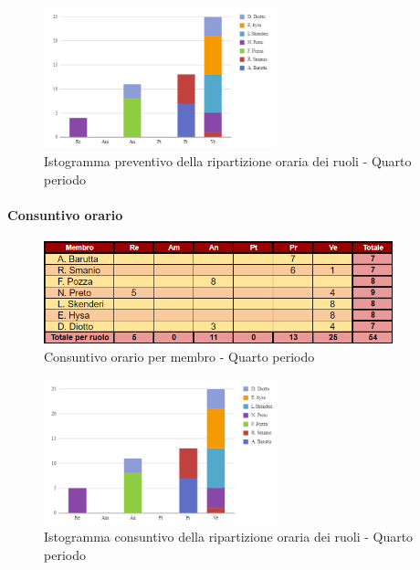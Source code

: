 \vspace{0.6cm}

\begin{figure}[H]
    \centering
    \includegraphics[width=0.6\textwidth]{../Images/preventivoDivisioneRuoli4Periodo.png}
    \caption{Istogramma preventivo della ripartizione oraria dei ruoli - Quarto periodo}
    \label{fig:Preventivo_ripartizione_oraria_4}
\end{figure}

\paragraph{Consuntivo orario} 

\begin{figure}[H]
    \centering
    \includegraphics[width=0.9\textwidth]{../Images/consuntivoOrario4Periodo.png}
    \caption{Consuntivo orario per membro - Quarto periodo}
    \label{fig:Constuntivo_orario_4}
\end{figure}

\vspace{0.4cm}

\begin{figure}[H]
    \centering
    \includegraphics[width=0.6\textwidth]{../Images/consuntivoDivisioneRuoli4Periodo.png}
    \caption{Istogramma consuntivo della ripartizione oraria dei ruoli - Quarto periodo}
    \label{fig:Consuntivo_ripartizione_oraria_4}
\end{figure}

